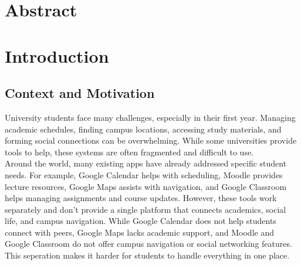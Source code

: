 \documentclass[12pt]{article}
\begin{document}
\newpage
\listoffigures
{}
\renewcommand{\listtablename}{LIST OF TABLES}
\renewcommand{\cftlottitlefont}{\Large\bfseries} 
\renewcommand{\cftafterlottitle}{
    \par\noindent\vspace{-0.5em}
    \textcolor{blue}{\rule{\textwidth}{0.5pt}}
    \vspace{1em} 
}
\renewcommand{\cfttabpresnum}{Table~}
\renewcommand{\cfttabaftersnum}{:}
\setlength{\cfttabnumwidth}{5em}
\newpage

\listoftables
{}
\newpage
\section*{Abstract}


\newpage

\section{Introduction}

\subsection{Context and Motivation}
University students face many challenges, especially in their first year. Managing academic schedules, finding campus locations, accessing study materials, and forming social connections can be overwhelming.
While some universities provide tools to help, these systems are often fragmented and difficult to use. \\

Around the world, many existing apps have already addressed specific student needs. 
For example, Google Calendar helps with scheduling, Moodle provides lecture resources, Google Maps assists with navigation, and Google Classroom helps managing assignments and course updates.
However, these tools work separately and don’t provide a single platform that connects academics, social life, and campus navigation.
While Google Calendar does not help students connect with peers, Google Maps lacks academic support, and Moodle and Google Classroom do not offer campus navigation or social networking features.
This seperation makes it harder for students to handle everything in one place. \\
\end{document}
